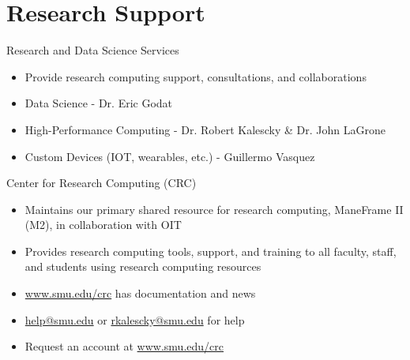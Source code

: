 \section{Research Support}

\begin{frame}{Research and Data Science Services}
\begin{itemize}
  \item Provide research computing support, consultations, and collaborations
  \item Data Science - Dr. Eric Godat
  \item High-Performance Computing - Dr. Robert Kalescky \& Dr. John LaGrone
  \item Custom Devices (IOT, wearables, etc.) - Guillermo Vasquez
\end{itemize}
\end{frame}

\begin{frame}{Center for Research Computing (CRC)}
\begin{itemize}
  \item Maintains our primary shared resource for research computing, ManeFrame II (M2), in collaboration with OIT
  \item Provides research computing tools, support, and training to all faculty, staff, and students using research computing resources
  \item \url{www.smu.edu/crc} has documentation and news
  \item \href{mailto:help@smu.edu}{help@smu.edu} or \href{mailto:rkalescky@smu.edu}{rkalescky@smu.edu} for help
  \item Request an account at \url{www.smu.edu/crc}
\end{itemize}
\end{frame}

